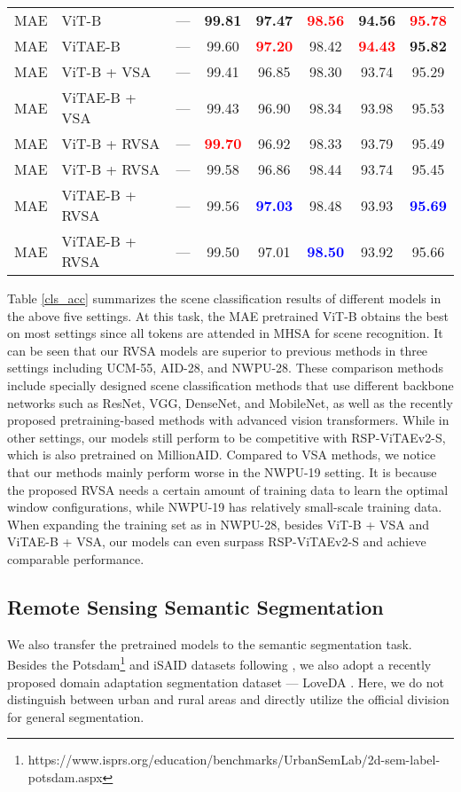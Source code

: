 \documentclass[10pt, journal,twoside]{IEEEtran}
\begin{document}
\begin{table*}[t]
{\begin{tabular}{l|l|l|ccccc}
MAE & ViT-B & --- & \bfseries 99.81 & \bfseries 97.47 & \textbf{\textcolor{red}{98.56}} & \bfseries 94.56 & \textbf{\textcolor{red}{95.78}} \\
MAE & ViTAE-B & --- & 99.60 & \textbf{\textcolor{red}{97.20}} & 98.42 & \textbf{\textcolor{red}{94.43}} & \bfseries 95.82 \\
MAE & ViT-B + VSA & --- & 99.41 & 96.85 & 98.30 & 93.74 &  95.29 \\
MAE & ViTAE-B + VSA & --- & 99.43 & 96.90  & 98.34 & 93.98 & 95.53 \\
  \hline
  MAE & ViT-B + RVSA & --- &  \textbf{\textcolor{red}{99.70}} & 96.92 & 98.33 & 93.79 & 95.49 \\
  MAE & ViT-B + RVSA & --- & 99.58 & 96.86 & 98.44 & 93.74 & 95.45 \\
  MAE & ViTAE-B + RVSA & ---& 99.56 & \textbf{\textcolor{blue}{97.03}} & 98.48 & 93.93 & \textbf{\textcolor{blue}{95.69}} \\
  MAE & ViTAE-B + RVSA& --- & 99.50 &  97.01 & \textbf{\textcolor{blue}{98.50}} & 93.92 & 95.66 \\
   \hline
\end{tabular}
  }
  \label{cls_acc}
\end{table*}

Table \ref{cls_acc} summarizes the scene classification results of different models in the above five settings. At this task, the MAE pretrained ViT-B obtains the best on most settings since all tokens are attended in MHSA for scene recognition. It can be seen that our RVSA models are superior to previous methods in three settings including UCM-55, AID-28, and NWPU-28. These comparison methods include specially designed scene classification methods that use different backbone networks such as ResNet, VGG, DenseNet, and MobileNet, as well as the recently proposed pretraining-based methods with advanced vision transformers. While in other settings, our models still perform to be competitive with RSP-ViTAEv2-S, which is also pretrained on MillionAID. Compared to VSA methods, we notice that our methods mainly perform worse in the NWPU-19 setting. It is because the proposed RVSA needs a certain amount of training data to learn the optimal window configurations, while NWPU-19 has relatively small-scale training data. When expanding the training set as in NWPU-28, besides ViT-B + VSA and ViTAE-B + VSA, our models can even surpass RSP-ViTAEv2-S and achieve comparable performance.


\subsection{Remote Sensing Semantic Segmentation}
We also transfer the pretrained models to the semantic segmentation task. Besides the Potsdam\footnote{https://www.isprs.org/education/benchmarks/UrbanSemLab/2d-sem-label-potsdam.aspx} and iSAID \cite{isaid} datasets following \cite{wang_rsp_2022}, we also adopt a recently proposed domain adaptation segmentation dataset --- LoveDA \cite{loveda}. Here, we do not distinguish between urban and rural areas and directly utilize the official division for general segmentation.
\end{document}

